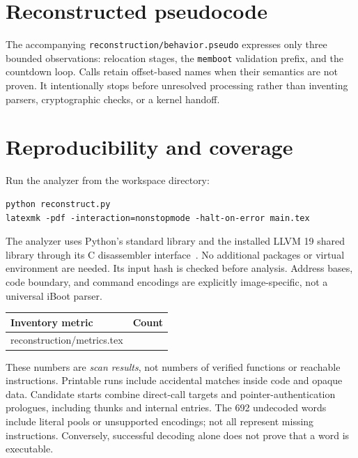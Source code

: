 \documentclass[11pt]{article}
\makeatletter
\newcommand{\tableinput}[1]{\@@input #1 }
\makeatother
\begin{document}
\section{Reconstructed pseudocode}
The accompanying \texttt{reconstruction/behavior.pseudo} expresses only
three bounded observations: relocation stages, the \texttt{memboot} validation
prefix, and the countdown loop. Calls retain offset-based names when their
semantics are not proven. It intentionally stops before unresolved processing
rather than inventing parsers, cryptographic checks, or a kernel handoff.

\section{Reproducibility and coverage}
Run the analyzer from the workspace directory:
\begin{Verbatim}[fontsize=\small]
python reconstruct.py
latexmk -pdf -interaction=nonstopmode -halt-on-error main.tex
\end{Verbatim}
The analyzer uses Python's standard library and the installed LLVM 19 shared
library through its C disassembler interface~\cite{llvm}. No additional
packages or virtual environment are needed. Its input hash is checked before
analysis. Address bases, code boundary, and command encodings are explicitly
image-specific, not a universal iBoot parser.

\begin{center}
\begin{tabular}{@{}lr@{}}
\toprule
Inventory metric & Count \\
\midrule
\tableinput{reconstruction/metrics.tex}
\bottomrule
\end{tabular}
\end{center}
These numbers are \emph{scan results}, not numbers of verified functions or
reachable instructions. Printable runs include accidental matches inside
code and opaque data. Candidate starts combine direct-call targets and
pointer-authentication prologues, including thunks and internal entries.
The 692 undecoded words include literal pools or unsupported encodings;
not all represent missing instructions. Conversely, successful decoding
alone does not prove that a word is executable.
\end{document}
